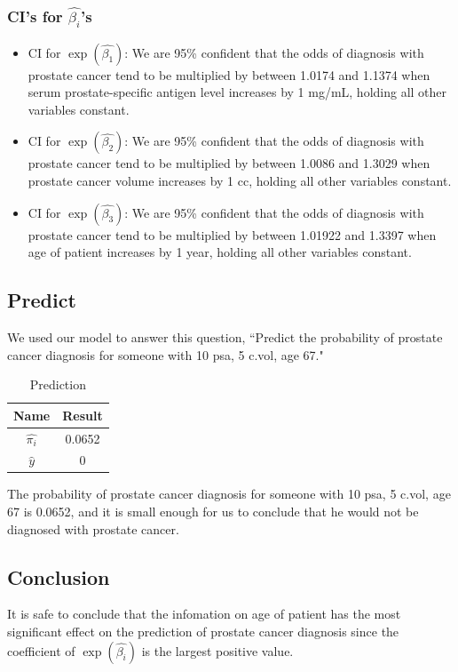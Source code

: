 \documentclass[a4paper,11pt,onecolumn,twoside]{article}
\begin{document}
\subsubsection{CI's for $\hat{\beta_{i}}$'s}
\begin{itemize}
	\item CI for $\exp(\hat{\beta_{1}})$: We are 95\% confident that the odds of diagnosis with prostate cancer tend to be multiplied by between 1.0174 and 1.1374 when serum prostate-specific antigen level increases by 1 mg/mL, holding all other variables constant.
	\item CI for $\exp(\hat{\beta_{2}})$: We are 95\% confident that the odds of diagnosis with prostate cancer tend to be multiplied by between 1.0086 and 1.3029 when prostate cancer volume increases by 1 cc, holding all other variables constant.
	\item CI for $\exp(\hat{\beta_{3}})$: We are 95\% confident that the odds of diagnosis with prostate cancer tend to be multiplied by between 1.01922 and 1.3397 when age of patient increases by 1 year, holding all other variables constant. 
\end{itemize}
\subsection{Predict}
We used our model to answer this question, ``Predict the probability of prostate cancer diagnosis for someone with 10 psa, 5 c.vol, age 67."\par
\begin{table}[htbp]
	\centering
	\begin{tabular}{cc}
		\midrule[1.5pt]
		Name&Result\\
		\hline 
		$\hat{\pi_{i}}$&0.0652\\
		$\hat{y}$&0\\
		\midrule[1.5pt]
	\end{tabular}
	\caption{Prediction}
\end{table}
The probability of prostate cancer diagnosis for someone with 10 psa, 5 c.vol, age 67 is 0.0652, and it is small enough for us to conclude that he would not be diagnosed with prostate cancer.\par
\subsection{Conclusion}
It is safe to conclude that the infomation on age of patient has the most significant effect on the prediction of prostate cancer diagnosis since the coefficient of $\exp(\hat{\beta_{i}})$ is the largest positive value.\par
\end{document}
